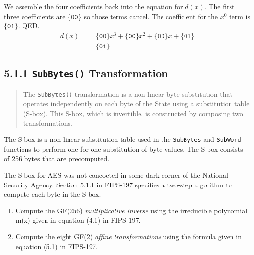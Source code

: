 \documentclass{article}
\begin{document}
We assemble the four coefficients back into the equation for $d(x)$.
The first three coefficients are $\{\mathtt{00}\}$ so those terms cancel.
The coefficient for the $x^0$ term is $\{\mathtt{01}\}$. QED.
\begin{eqnarray*}
  d(x) &=& \{\mathtt{00}\}x^3 + \{\mathtt{00}\}x^2 + \{\mathtt{00}\}x + \{\mathtt{01}\} \\
       &=& \{\mathtt{01}\}
\end{eqnarray*}

\subsection*{5.1.1 \texttt{SubBytes()} Transformation}

\begin{quote}
  The \texttt{SubBytes()} transformation is a non-linear byte substitution 
  that operates independently on each byte of the State using a substitution 
  table (S-box). This S-box, which is invertible, is constructed by composing 
  two transformations.
\end{quote}

The S-box is a non-linear substitution table 
used in the \texttt{SubBytes} and \texttt{SubWord} functions
to perform one-for-one substitution of byte values.
The S-box consists of 256 bytes that are precomputed.

The S-box for AES was not concocted in some dark corner
of the National Security Agency.
Section 5.1.1 in FIPS-197 specifies a two-step algorithm 
to compute each byte in the S-box.
\begin{enumerate}
\item
  Compute the GF(256) \emph{multiplicative inverse}
  using the irreducible polynomial m(x) given in 
  equation (4.1) in FIPS-197.
\item
  Compute the eight GF(2) \emph{affine transformations}
  using the formula given in equation (5.1) in FIPS-197.
\end{enumerate}
\end{document}
